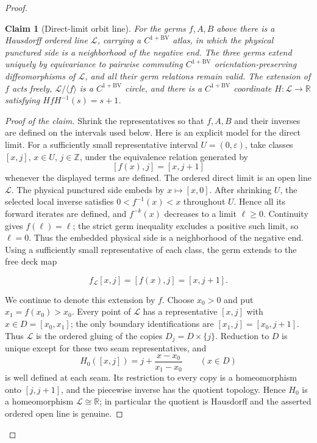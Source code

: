 \documentclass[11pt]{article}
\newtheorem{claim}[theorem]{Claim}
\theoremstyle{definition}
\theoremstyle{remark}
\begin{document}
\begin{proof}
\begin{claim}[Direct-limit orbit line]\label{clm:direct-limit-orbit-line}
For the germs \(f,A,B\) above there is a Hausdorff ordered line
\(\mathscr L\), carrying a \(C^{1+\mathrm{BV}}\) atlas, in which the physical
punctured side is a neighborhood of the negative end.  The three germs
extend uniquely by equivariance to pairwise commuting
\(C^{1+\mathrm{BV}}\) orientation-preserving diffeomorphisms of
\(\mathscr L\), and all their germ relations remain valid.  The extension
of \(f\) acts freely, \(\mathscr L/\langle f\rangle\) is a
\(C^{1+\mathrm{BV}}\) circle, and there is a
\(C^{1+\mathrm{BV}}\) coordinate \(H:\mathscr L\to\mathbb R\) satisfying
\(HfH^{-1}(s)=s+1\).
\end{claim}

\begin{proof}[Proof of the claim]
Shrink the representatives so that $f,A,B$ and their inverses are defined on
the intervals used below.  Here is an explicit model for the direct limit.
For a sufficiently small representative interval \(U=(0,\varepsilon)\),
take classes \([x,j]\), \(x\in U\), \(j\in\mathbb Z\), under the
equivalence relation generated by
\begin{equation}\label{eq:direct-limit-relation}
 [f(x),j]=[x,j+1]
\end{equation}
whenever the displayed terms are defined.  The ordered direct limit is an
open line \(\mathscr L\).  The physical punctured side embeds by
\(x\mapsto[x,0]\).  After shrinking \(U\), the selected local inverse
satisfies \(0<f^{-1}(x)<x\) throughout \(U\).  Hence all its forward iterates
are defined, and \(f^{-k}(x)\) decreases to a limit \(\ell\geq0\).
Continuity gives \(f(\ell)=\ell\); the strict germ inequality excludes a
positive such limit, so \(\ell=0\).  Thus the embedded physical side is a
neighborhood of
the negative end.  Using a sufficiently small representative of each class,
the germ extends to the free deck map

\[
 f_{\mathscr L}[x,j]=[f(x),j]=[x,j+1].
\]

We continue to denote this extension by \(f\).  Choose \(x_0>0\) and put
\(x_1=f(x_0)>x_0\).  Every point of \(\mathscr L\) has a representative
\([x,j]\) with \(x\in D=[x_0,x_1]\); the only boundary identifications are
\([x_1,j]=[x_0,j+1]\).  Thus \(\mathscr L\) is the ordered gluing of the
copies \(D_j=D\times\{j\}\).  Reduction to \(D\) is unique except for these
two seam representatives, and
\[
 H_0([x,j])=j+\frac{x-x_0}{x_1-x_0}\qquad(x\in D)
\]
is well defined at each seam.  Its restriction to every copy is a
homeomorphism onto \([j,j+1]\), and the piecewise inverse has the quotient
topology.  Hence \(H_0\) is a homeomorphism
\(\mathscr L\cong\mathbb R\); in particular the quotient is Hausdorff and
the asserted ordered open line is genuine.


\end{proof}
\end{proof}
\end{document}
